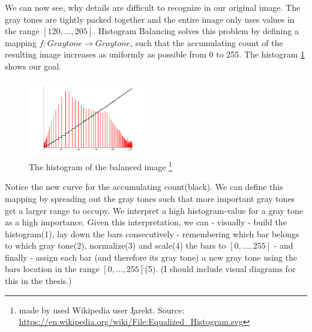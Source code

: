 \documentclass{article}
\newcommand{\note}[1]{{\tiny (#1)}}
\newcommand{\range}[2]{$[#1,...,#2]$}
\begin{document}
      We can now see, why details are difficult to recognize in our original image.
      The gray tones are tightly packed together and the
      entire image only uses values in the range \range{120}{205}.
      Histogram Balancing solves this problem by defining a mapping
      $f: Graytone \rightarrow Graytone$, such that the accumulating count
      of the resulting image increases as uniformly as possible from 0 to 255.
      The histogram \ref{fig:hist-eq} shows our goal.
      
      \begin{figure}[h]
        \centering
        \includegraphics[width=0.45\textwidth]{hist-eq}
        \caption{The histogram of the balanced image
        \footnote{made by used Wikipedia user \c{Jarekt}. Source: \url{https://en.wikipedia.org/wiki/File:Equalized_Histogram.svg}}
        }
        \label{fig:hist-eq}
      \end{figure}
      
      Notice the new curve for the accumulating count(black). We can define
      this mapping by spreading out the gray tones such that more
      important gray tones get a larger range to occupy. We interpret
      a high histogram-value for a gray tone as a high importance.
      Given this interpretation, we can - visually - build the histogram(1),
      lay down the bars consecutively - remembering which
      bar belongs to which gray tone(2), normalize(3) and scale(4) the bars to \range{0}{255} - 
      and finally - assign each bar (and therefore its gray tone) a new gray tone
      using the bars location in the range \range{0}{255}(5). \note{I should include visual diagrams for this in the thesis.}
      
\end{document}
